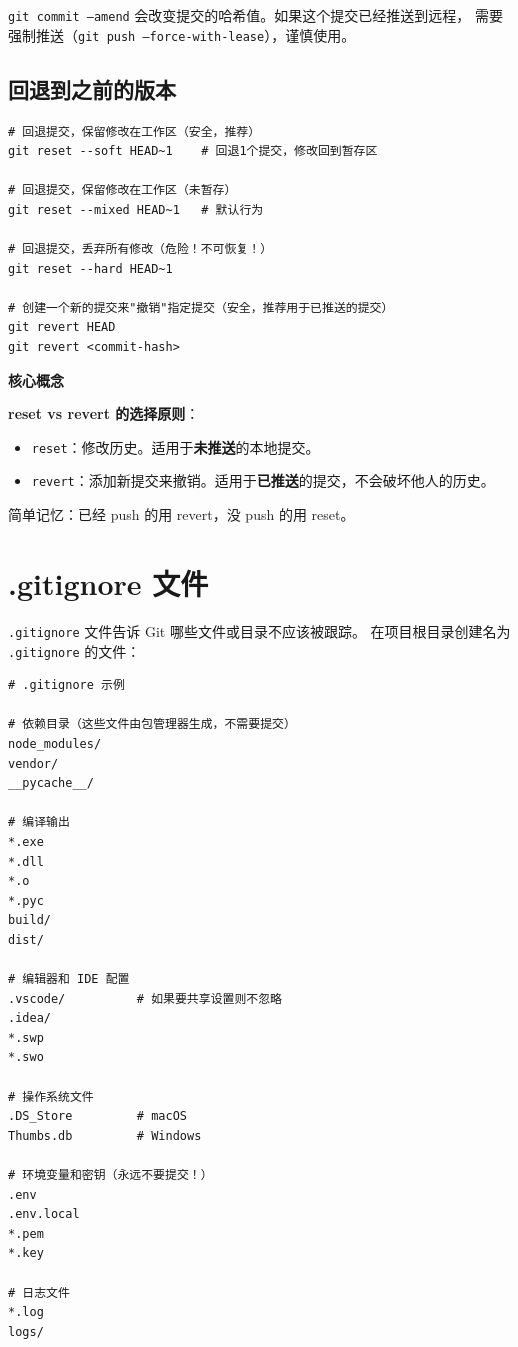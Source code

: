 \documentclass[12pt,a4paper,openany]{ctexbook}
\newenvironment{keybox}{%
  \medskip
  \noindent\textbf{\faKey\; 核心概念}
  \smallskip
}{%
  \medskip
}
\begin{document}
\begin{warnbox}
\texttt{git commit --amend} 会改变提交的哈希值。如果这个提交已经推送到远程，
需要强制推送（\texttt{git push --force-with-lease}），谨慎使用。
\end{warnbox}

\subsection{回退到之前的版本}

\begin{lstlisting}[style=shell]
# 回退提交，保留修改在工作区（安全，推荐）
git reset --soft HEAD~1    # 回退1个提交，修改回到暂存区

# 回退提交，保留修改在工作区（未暂存）
git reset --mixed HEAD~1   # 默认行为

# 回退提交，丢弃所有修改（危险！不可恢复！）
git reset --hard HEAD~1

# 创建一个新的提交来"撤销"指定提交（安全，推荐用于已推送的提交）
git revert HEAD
git revert <commit-hash>
\end{lstlisting}

\begin{keybox}
\textbf{reset vs revert 的选择原则}：
\begin{itemize}
  \item \texttt{reset}：修改历史。适用于\textbf{未推送}的本地提交。
  \item \texttt{revert}：添加新提交来撤销。适用于\textbf{已推送}的提交，不会破坏他人的历史。
\end{itemize}
简单记忆：已经 push 的用 revert，没 push 的用 reset。
\end{keybox}

\section{.gitignore 文件}

\texttt{.gitignore} 文件告诉 Git 哪些文件或目录不应该被跟踪。
在项目根目录创建名为 \texttt{.gitignore} 的文件：

\begin{lstlisting}[style=shell]
# .gitignore 示例

# 依赖目录（这些文件由包管理器生成，不需要提交）
node_modules/
vendor/
__pycache__/

# 编译输出
*.exe
*.dll
*.o
*.pyc
build/
dist/

# 编辑器和 IDE 配置
.vscode/          # 如果要共享设置则不忽略
.idea/
*.swp
*.swo

# 操作系统文件
.DS_Store         # macOS
Thumbs.db         # Windows

# 环境变量和密钥（永远不要提交！）
.env
.env.local
*.pem
*.key

# 日志文件
*.log
logs/
\end{lstlisting}
\end{document}
